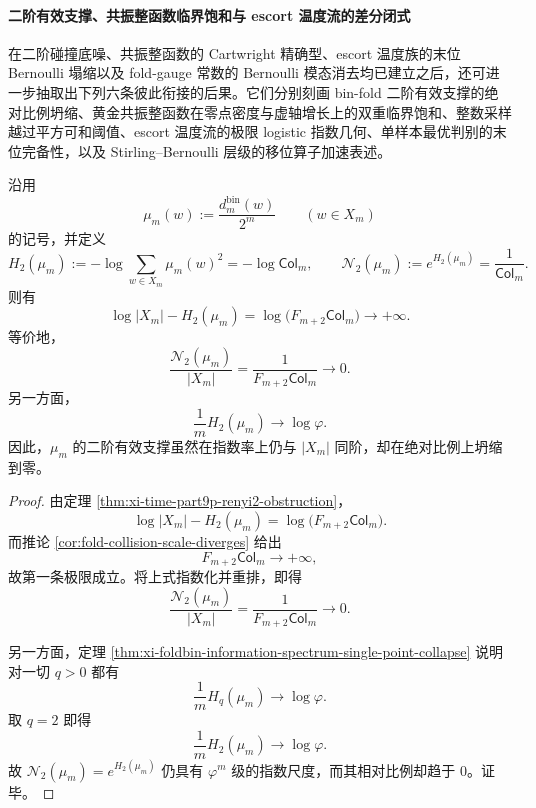 \paragraph{二阶有效支撑、共振整函数临界饱和与 escort 温度流的差分闭式}
在二阶碰撞底噪、共振整函数的 Cartwright 精确型、escort 温度族的末位 Bernoulli 塌缩以及 fold-gauge 常数的 Bernoulli 模态消去均已建立之后，还可进一步抽取出下列六条彼此衔接的后果。它们分别刻画 bin-fold 二阶有效支撑的绝对比例坍缩、黄金共振整函数在零点密度与虚轴增长上的双重临界饱和、整数采样越过平方可和阈值、escort 温度流的极限 logistic 指数几何、单样本最优判别的末位完备性，以及 Stirling--Bernoulli 层级的移位算子加速表述。

\begin{theorem}\label{thm:xi-time-part9s-renyi2-effective-support-collapse}
沿用
\[
\mu_m(w):=\frac{d_m^{\mathrm{bin}}(w)}{2^m}
\qquad (w\in X_m)
\]
的记号，并定义
\[
H_2(\mu_m):=-\log\sum_{w\in X_m}\mu_m(w)^2
=-\log \mathsf{Col}_m,
\qquad
\mathcal N_2(\mu_m):=e^{H_2(\mu_m)}=\frac{1}{\mathsf{Col}_m}.
\]
则有
\[
\log |X_m|-H_2(\mu_m)
=
\log\!\bigl(F_{m+2}\mathsf{Col}_m\bigr)
\longrightarrow +\infty.
\]
等价地，
\[
\frac{\mathcal N_2(\mu_m)}{|X_m|}
=
\frac{1}{F_{m+2}\mathsf{Col}_m}
\longrightarrow 0.
\]
另一方面，
\[
\frac{1}{m}H_2(\mu_m)\longrightarrow \log\varphi.
\]
因此，\(\mu_m\) 的二阶有效支撑虽然在指数率上仍与 \(|X_m|\) 同阶，却在绝对比例上坍缩到零。
\end{theorem}
\begin{proof}
由定理 \ref{thm:xi-time-part9p-renyi2-obstruction}，
\[
\log |X_m|-H_2(\mu_m)
=
\log\!\bigl(F_{m+2}\mathsf{Col}_m\bigr).
\]
而推论 \ref{cor:fold-collision-scale-diverges} 给出
\[
F_{m+2}\mathsf{Col}_m\longrightarrow +\infty,
\]
故第一条极限成立。将上式指数化并重排，即得
\[
\frac{\mathcal N_2(\mu_m)}{|X_m|}
=
\frac{1}{F_{m+2}\mathsf{Col}_m}
\longrightarrow 0.
\]

另一方面，定理 \ref{thm:xi-foldbin-information-spectrum-single-point-collapse} 说明对一切 \(q>0\) 都有
\[
\frac{1}{m}H_q(\mu_m)\longrightarrow \log\varphi.
\]
取 \(q=2\) 即得
\[
\frac{1}{m}H_2(\mu_m)\longrightarrow \log\varphi.
\]
故
\(
\mathcal N_2(\mu_m)=e^{H_2(\mu_m)}
\)
仍具有 \(\varphi^m\) 级的指数尺度，而其相对比例却趋于 \(0\)。证毕。
\end{proof}

